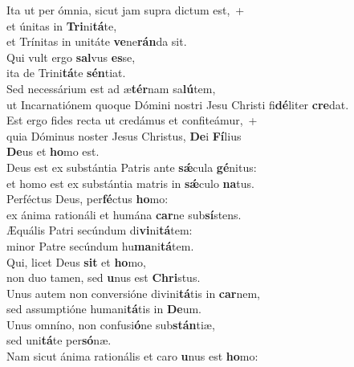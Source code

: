 \oddverse Ita ut per ómnia, sicut jam supra dictum est,~+\\
\oddverse  et únitas in \textbf{Tri}ni\textbf{tá}te,~\*\\
\oddverse et Trínitas in unitáte \textbf{ve}ne\textbf{rán}da sit.\\
\evenverse Qui vult ergo \textbf{sal}vus \textbf{es}se,~\*\\
\evenverse ita de Trini\textbf{tá}te \textbf{sén}tiat.\\
\oddverse Sed necessárium est ad æ\textbf{tér}nam sa\textbf{lú}tem,~\*\\
\oddverse ut Incarnatiónem quoque Dómini nostri Jesu Christi fi\textbf{dé}liter \textbf{cre}dat.\\
\evenverse Est ergo fides recta ut credámus et confiteámur,~+\\
\evenverse  quia Dóminus noster Jesus Christus, \textbf{De}i \textbf{Fí}lius~\*\\
\evenverse \textbf{De}us et \textbf{ho}mo est.\\
\oddverse Deus est ex substántia Patris ante \textbf{sǽ}cula \textbf{gé}nitus:~\*\\
\oddverse et homo est ex substántia matris in \textbf{sǽ}culo \textbf{na}tus.\\
\evenverse Perféctus Deus, per\textbf{fé}ctus \textbf{ho}mo:~\*\\
\evenverse ex ánima rationáli et humána \textbf{car}ne sub\textbf{sí}stens.\\
\oddverse Æquális Patri secúndum di\textbf{vi}ni\textbf{tá}tem:~\*\\
\oddverse minor Patre secúndum hu\textbf{ma}ni\textbf{tá}tem.\\
\evenverse Qui, licet Deus \textbf{sit} et \textbf{ho}mo,~\*\\
\evenverse non duo tamen, sed \textbf{u}nus est \textbf{Chri}stus.\\
\oddverse Unus autem non conversióne divini\textbf{tá}tis in \textbf{car}nem,~\*\\
\oddverse sed assumptióne humani\textbf{tá}tis in \textbf{De}um.\\
\evenverse Unus omníno, non confusi\textbf{ó}ne sub\textbf{stán}tiæ,~\*\\
\evenverse sed uni\textbf{tá}te per\textbf{só}næ.\\
\oddverse Nam sicut ánima rationális et caro \textbf{u}nus est \textbf{ho}mo:~\*\\
